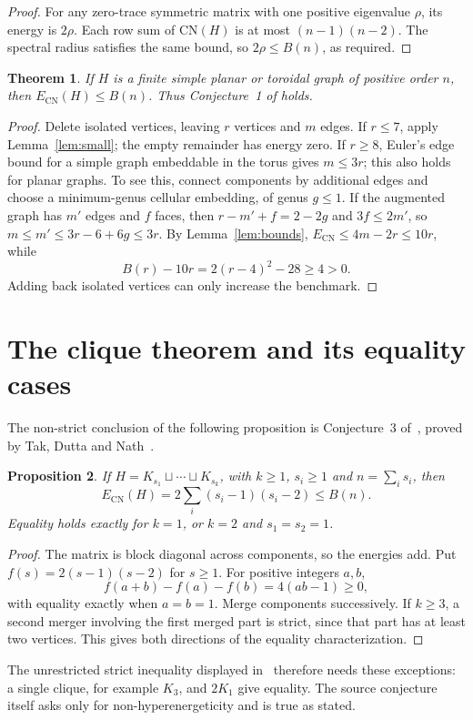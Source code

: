 \documentclass[11pt]{article}
\newtheorem{theorem}{Theorem}
\newtheorem{proposition}[theorem]{Proposition}
\newcommand{\ECN}{E_{\mathrm{CN}}}
\newcommand{\CN}{\mathrm{CN}}
\begin{document}
\begin{proof}
For any zero-trace symmetric matrix with one positive eigenvalue $\rho$,
its energy is $2\rho$. Each row sum of $\CN(H)$ is at most
$(n-1)(n-2)$. The spectral radius satisfies the same bound, so
$2\rho\le B(n)$, as required.
\end{proof}

\begin{theorem}\label{thm:surfaces}
If $H$ is a finite simple planar or toroidal graph of positive order $n$,
then $\ECN(H)\le B(n)$. Thus Conjecture~1 of
\cite[Section~4, p.~11]{NFDS} holds.
\end{theorem}
\begin{proof}
Delete isolated vertices, leaving $r$ vertices and $m$ edges. If $r\le7$,
apply Lemma~\ref{lem:small}; the empty remainder has energy zero.
If $r\ge8$, Euler's edge bound for a simple graph embeddable in the
torus gives $m\le3r$; this also holds for planar graphs. To see this,
connect components by additional edges and choose a minimum-genus
cellular embedding, of genus $g\le1$. If the augmented graph has $m'$
edges and $f$ faces, then $r-m'+f=2-2g$ and $3f\le2m'$, so
$m\le m'\le3r-6+6g\le3r$.
By Lemma~\ref{lem:bounds}, $\ECN\le4m-2r\le10r$, while
\[
 B(r)-10r=2(r-4)^2-28\ge4>0.
\]
Adding back isolated vertices can only increase the benchmark.
\end{proof}

\section{The clique theorem and its equality cases}\label{sec:cliques}
The non-strict conclusion of the following proposition is Conjecture~3
of~\cite[Section~4, p.~11]{NFDS}, proved by Tak, Dutta and
Nath~\cite[Theorem~5.4, pp.~14--15]{TDN}.

\begin{proposition}\label{prop:cliques}
If $H=K_{s_1}\sqcup\cdots\sqcup K_{s_k}$, with $k\ge1$, $s_i\ge1$
and $n=\sum_i s_i$, then
\[
 \ECN(H)=2\sum_i(s_i-1)(s_i-2)\le B(n).
\]
Equality holds exactly for $k=1$, or $k=2$ and $s_1=s_2=1$.
\end{proposition}
\begin{proof}
The matrix is block diagonal across components, so the energies add.
Put $f(s)=2(s-1)(s-2)$ for $s\ge1$. For positive integers $a,b$,
\[
 f(a+b)-f(a)-f(b)=4(ab-1)\ge0,
\]
with equality exactly when $a=b=1$. Merge components successively.
If $k\ge3$, a second merger involving the first merged part is strict,
since that part has at least two vertices. This gives both directions
of the equality characterization.
\end{proof}
The unrestricted strict inequality displayed in~\cite[Theorem~5.4]{TDN}
therefore needs these exceptions: a single clique, for example $K_3$,
and $2K_1$ give equality. The source conjecture itself asks only for
non-hyperenergeticity and is true as stated.
\end{document}
